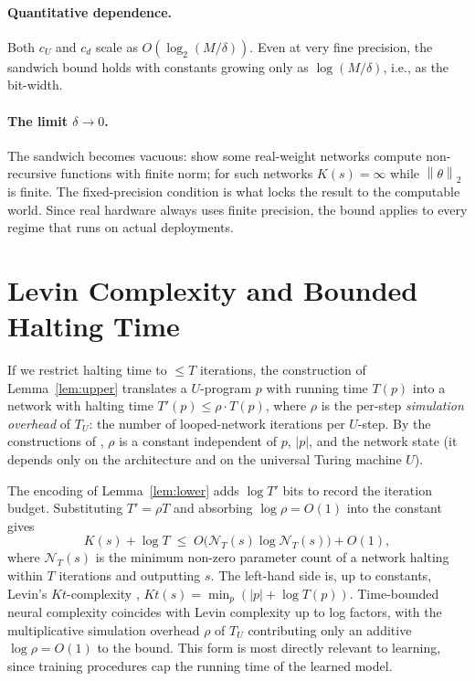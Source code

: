 \documentclass{article}
\theoremstyle{definition}
\newcommand{\norm}[1]{\left\lVert#1\right\rVert}
\newcommand{\nc}{\mathcal{N}}
\begin{document}
\paragraph{Quantitative dependence.} Both $c_U$ and $c_d$ scale as $O(\log_2(M/\delta))$. Even at very fine
precision, the sandwich bound holds with constants growing only as
$\log(M/\delta)$, i.e., as the bit-width.

\paragraph{The limit $\delta \to 0$.} The sandwich becomes vacuous: \citet{siegelmann1995computational} show some
real-weight networks compute non-recursive functions with finite norm; for such
networks $K(s) = \infty$ while $\norm{\theta}_2$ is finite. The fixed-precision
condition is what locks the result to the computable world. Since real hardware
always uses finite precision, the bound applies to every regime that runs on
actual deployments.

\section{Levin Complexity and Bounded Halting Time}\label{app:levin}

If we restrict halting time to $\le T$ iterations, the construction of
Lemma~\ref{lem:upper} translates a $U$-program $p$ with running time $T(p)$
into a network with halting time $T'(p) \le \rho \cdot T(p)$, where $\rho$ is
the per-step \emph{simulation overhead} of $T_U$: the number of looped-network
iterations per $U$-step. By the constructions of
\citet{li2025constant,giannou2023looped}, $\rho$ is a constant independent of
$p$, $|p|$, and the network state (it depends only on the architecture and on
the universal Turing machine $U$).

The encoding of Lemma~\ref{lem:lower} adds $\log T'$ bits to record the
iteration budget. Substituting $T' = \rho T$ and absorbing $\log \rho = O(1)$
into the constant gives
\[
  K(s) + \log T \;\le\; O\!\bigl(\nc_T(s) \log \nc_T(s)\bigr) + O(1),
\]
where $\nc_T(s)$ is the minimum non-zero parameter count of a network halting
within $T$ iterations and outputting $s$. The left-hand side is, up to
constants, Levin's $Kt$-complexity \citep{levin1973universal}, $Kt(s) = \min_p
  (|p| + \log T(p))$. Time-bounded neural complexity coincides with Levin
complexity up to log factors, with the multiplicative simulation overhead
$\rho$ of $T_U$ contributing only an additive $\log \rho = O(1)$ to the bound.
This form is most directly relevant to learning, since training procedures cap
the running time of the learned model.
\end{document}
